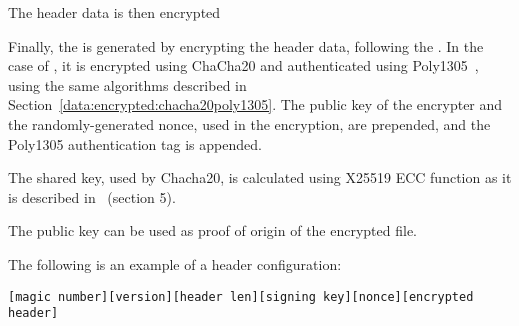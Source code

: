 The header data is then encrypted 
%

Finally, the  is generated by encrypting the header data, following the .
%
In the case of , it is encrypted using ChaCha20 and authenticated using Poly1305~\cite{RFC8439}, using the same algorithms described in Section~\ref{data:encrypted:chacha20poly1305}.
%
The public key of the encrypter and the randomly-generated nonce, used in the encryption, are prepended, and the Poly1305 authentication tag is appended.


The shared key, used by Chacha20, is calculated using X25519 ECC function as it is described in~\cite{RFC7748} (section 5).
%

The public key can be used as proof of origin of the encrypted file.
%


The following is an example of a header configuration:
%
\begin{verbatim}
[magic number][version][header len][signing key][nonce][encrypted header]
\end{verbatim}

